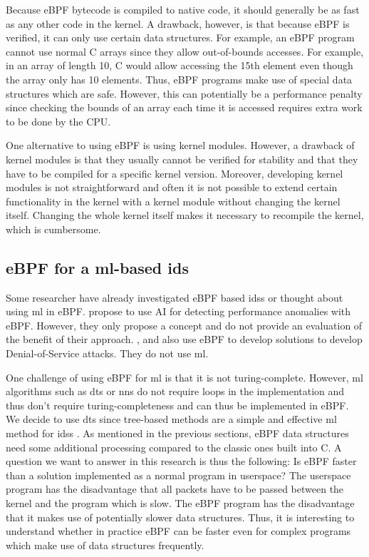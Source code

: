 \documentclass[conference]{IEEEtran}
\begin{document}
Because eBPF bytecode is compiled to native code, it should generally be as fast as any other code in the kernel. A drawback, however, is that because eBPF is verified, it can only use certain data structures. For example, an eBPF program cannot use normal C arrays since they allow out-of-bounds accesses. For example, in an array of length 10, C would allow accessing the 15th element even though the array only has 10 elements. Thus, eBPF programs make use of special data structures which are safe. However, this can potentially be a performance penalty since checking the bounds of an array each time it is accessed requires extra work to be done by the CPU. 

One alternative to using eBPF is using kernel modules. However, a drawback of kernel modules is that they usually cannot be verified for stability and that they have to be compiled for a specific kernel version. Moreover, developing kernel modules is not straightforward and often it is not possible to extend certain functionality in the kernel with a kernel module without changing the kernel itself. Changing the whole kernel itself makes it necessary to recompile the kernel, which is cumbersome. 

\subsection{eBPF for a \gls{ml}-based \gls{ids}}

Some researcher have already investigated eBPF based \glspl{ids} or thought about using \gls{ml} in eBPF. \cite{ben-yair_ai_2019} propose to use AI for detecting performance anomalies with eBPF. However, they only propose a concept and do not provide an evaluation of the benefit of their approach. \cite{demoulin_detecting_2019}, \cite{van_wieren_signature-based_2019} and also \cite{choe_ebpfxdp_2020} use eBPF to develop solutions to develop Denial-of-Service attacks. They do not use \gls{ml}. 

One challenge of using eBPF for \gls{ml} is that it is not turing-complete. However, \gls{ml} algorithms such as \glspl{dt} or \glspl{nn} do not require loops in the implementation and thus don't require turing-completeness and can thus be implemented in eBPF. We decide to use \glspl{dt} since tree-based methods are a simple and effective \gls{ml} method for \glspl{ids} \cite{iglesias_ntarc_2020}. As mentioned in the previous sections, eBPF data structures need some additional processing compared to the classic ones built into C. A question we want to answer in this research is thus the following: Is eBPF faster than a solution implemented as a normal program in userspace? The userspace program has the disadvantage that all packets have to be passed between the kernel and the program which is slow. The eBPF program has the disadvantage that it makes use of potentially slower data structures. Thus, it is interesting to understand whether in practice eBPF can be faster even for complex programs which make use of data structures frequently. 
\end{document}
